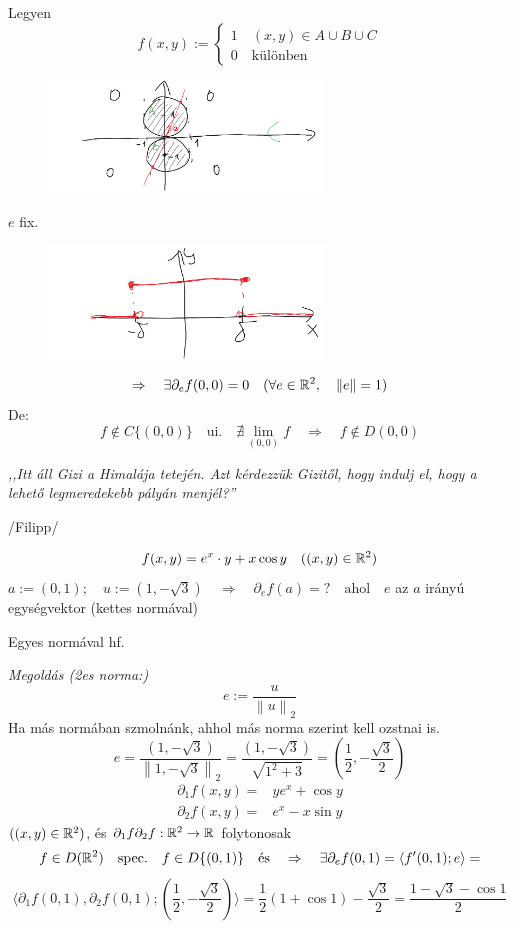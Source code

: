 \documentclass[a4paper,11.5pt]{article}
\newcommand{\norm}[1]{\left\lVert#1\right\rVert}
\begin{document}
	\begin{note}
		Legyen
		\[ f(x,y):=\begin{cases}
			1\quad (x,y)\in A\cup B\cup C\\
			0\quad \text{különben}
		\end{cases} \]
		\begin{figure}[H]
			\centering
			\includegraphics[height=3cm]{kepek/05.png}
			\caption{}
		\end{figure}
		$e$ fix.
		\begin{figure}[H]
			\centering
			\includegraphics[height=3cm]{kepek/06.png}
			\caption{}
		\end{figure}
		\[ \Rightarrow\quad \exists\partial_ef(0,0)=0\quad (\forall e\in\R^2,\quad \norm{e}=1) \]
		De:
		\[ f\notin C\{(0,0)\} \quad \text{ui.}\quad \nexists\lim_{(0,0)}f\quad \Rightarrow\quad f\notin D(0,0) \]
	\end{note}
	\begin{center}
		\textit{,,Itt áll Gizi a Himalája tetején. Azt kérdezzük Gizitől, hogy indulj el, hogy a lehető legmeredekebb pályán menjél?''}
		
		/Filipp/
	\end{center}
	\begin{task}
		\[ f(x,y)=e^x\cdot y+x\cos y\quad ((x,y)\in\mathbb{R}^2) \]
		$a:=(0,1);\quad u:=(1,-\sqrt{3})\quad \Rightarrow\quad \partial_ef(a)=?\quad \text{ahol}\quad e$ az $a$ irányú egységvektor (kettes normával)
		
		Egyes normával hf.
		
		\textit{Megoldás (2es norma:)} 
		\[ e:=\frac{u}{\norm{u}_2} \]
		Ha más normában szmolnánk, ahhol más norma szerint kell ozstnai is.
		\[ e=\frac{(1,-\sqrt{3})}{\norm{1,-\sqrt{3}}_2}=\frac{(1,-\sqrt{3})}{ \sqrt{1^2+3}}=\left(\frac{1}{2},-\frac{\sqrt{3}}{2}\right) \]
		\begin{align*}
			\partial_1f(x,y)=&ye^x+\cos y\\
			\partial_2f(x,y)=&e^x-x\sin y
		\end{align*}
		$((x,y)\in\mathbb{R}^2)$, és $\partial_1f\partial_2f:\mathbb{R}^2\to\mathbb{R}$ folytonosak
		\[ f\in D(\mathbb{R}^2)\quad \text{spec.}\quad f\in D\{(0,1)\}\quad \text{és}\quad \Rightarrow\quad \exists\partial_ef(0,1)=\langle f'(0,1);e\rangle=\]\[\langle \partial_1f(0,1),\partial_2f(0,1);\left(\frac{1}{2},-\frac{\sqrt{3}}{2}\right)\rangle=\frac{1}{2}(1+\cos 1)-\frac{\sqrt{3}}{2}=\frac{1-\sqrt{3}-\cos1}{2} \]
	\end{task}
\end{document}

